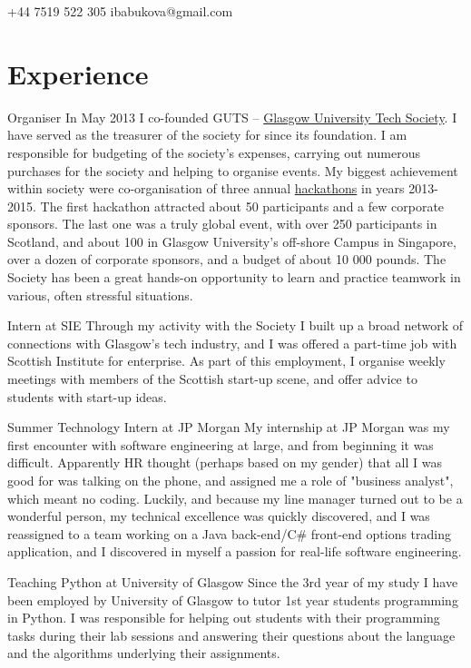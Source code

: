 \documentclass{tccv}
\begin{document}
\newpage

    {+44 7519 522 305}
    {ibabukova@gmail.com}



\section{Experience}

\begin{skillist}

\item{Organiser} {In May 2013 I co-founded GUTS -- \href{http://gutechsoc.com}{Glasgow University Tech Society}. I have served as the treasurer of the society for since its foundation. I am responsible for budgeting of the society's expenses, carrying out numerous purchases for the society and helping to organise events. My biggest achievement within society were co-organisation of three annual \href{http://storify.com/Eventhread/gu-hackaton}{hackathons} in years 2013-2015. The first hackathon attracted about 50 participants and a few corporate sponsors. The last one was a truly global event, with over 250 participants in Scotland, and about 100 in Glasgow University's off-shore Campus in Singapore, over a dozen of corporate sponsors, and a budget of about 10 000 pounds. The Society has been a great hands-on opportunity to learn and practice teamwork in various, often stressful situations.}
\item{Intern at SIE} {Through my activity with the Society I built up a broad network of connections with Glasgow's tech industry, and I was offered a part-time job with Scottish Institute for enterprise. As part of this employment, I organise weekly meetings with members of the Scottish start-up scene, and offer advice to students with start-up ideas. }

\item{Summer Technology Intern at JP Morgan} {My internship at JP Morgan was my first encounter with software engineering at large, and from beginning it was difficult. Apparently HR thought (perhaps based on my gender) that all I was good for was talking on the phone, and assigned me a role of "business analyst", which meant no coding. Luckily, and because my line manager turned out to be a wonderful person, my technical excellence was quickly discovered, and I was reassigned to a team working on a Java back-end/C\# front-end options trading application, and I discovered in myself a passion for real-life software engineering.}
\newpage
\item{Teaching Python at University of Glasgow} {Since the 3rd year of my study I have been employed by University of Glasgow to tutor 1st year students programming in Python. I was responsible for helping out students with their programming tasks during their lab sessions and answering their questions about the language and the algorithms underlying their assignments.}


\end{skillist}
\end{document}
